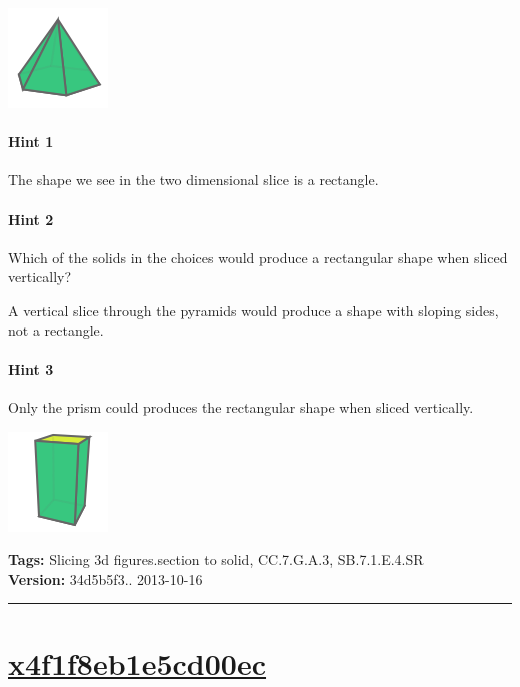 \documentclass[twocolumn,10pt]{article}
\def\shrinkfactor{0.4}
\begin{document}
\includegraphics[scale=\shrinkfactor]{figures/47526769b6e12df6ce07410a61d504c7f1d84475.png}



\paragraph{Hint 1}The shape we see in the two dimensional slice is a rectangle.

\paragraph{Hint 2}Which of the solids in the choices would produce a rectangular shape when sliced vertically? 

A vertical slice through the pyramids would produce a shape with sloping sides, not a rectangle.

\paragraph{Hint 3}Only the prism could produces the rectangular shape when sliced vertically.


\includegraphics[scale=\shrinkfactor]{figures/2ebec88f0b30eab2455be53549a16e7fc9469bd3.png}



\medskip
\noindent
\textbf{Tags:} {\footnotesize Slicing 3d figures.section to solid, CC.7.G.A.3, SB.7.1.E.4.SR}\\
\textbf{Version:} 34d5b5f3.. 2013-10-16
\smallskip\hrule





\section{\href{https://www.khanacademy.org/devadmin/content/items/x4f1f8eb1e5cd00ec}{x4f1f8eb1e5cd00ec}}
\end{document}
